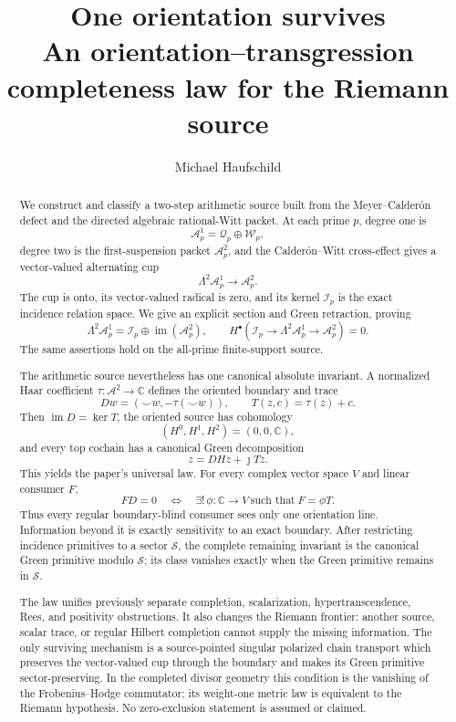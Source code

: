 \documentclass[11pt]{article}
\title{\textbf{One orientation survives}\\
\large An orientation--transgression completeness law for the Riemann source}
\author{Michael Haufschild}
\date{}
\theoremstyle{definition}
\theoremstyle{remark}
\newcommand{\C}{\mathbb C}
\newcommand{\cA}{\mathcal A}
\newcommand{\cI}{\mathcal I}
\newcommand{\cS}{\mathcal S}
\newcommand{\cQ}{\mathcal Q}
\newcommand{\cW}{\mathcal W}
\newcommand{\im}{\operatorname{im}}
\begin{document}
\maketitle

\begin{abstract}
We construct and classify a two-step arithmetic source built from the
Meyer--Calder\'on defect and the directed algebraic rational-Witt packet.
At each prime \(p\), degree one is
\[
  \cA_p^1=\cQ_p\oplus\cW_p,
\]
degree two is the first-suspension packet \(\cA_p^2\), and the
Calder\'on--Witt cross-effect gives a vector-valued alternating cup
\[
  \Lambda^2\cA_p^1\longrightarrow\cA_p^2.
\]
The cup is onto, its vector-valued radical is zero, and its kernel
\(\cI_p\) is the exact incidence relation space.  We give an explicit
section and Green retraction, proving
\[
  \Lambda^2\cA_p^1
    =\cI_p\oplus\im(\cA_p^2),\qquad
  H^\bullet\!\left(
    \cI_p\to\Lambda^2\cA_p^1\to\cA_p^2\right)=0.
\]
The same assertions hold on the all-prime finite-support source.

The arithmetic source nevertheless has one canonical absolute invariant.
A normalized Haar coefficient \(\tau:\cA^2\to\C\) defines the oriented
boundary and trace
\[
  D w=(\smile w,-\tau(\smile w)),\qquad
  T(z,c)=\tau(z)+c.
\]
Then \(\im D=\ker T\), the oriented source has cohomology
\[
                         (H^0,H^1,H^2)=(0,0,\C),
\]
and every top cochain has a canonical Green decomposition
\[
                         z=DHz+\jmath Tz.
\]
This yields the paper's universal law.  For every complex vector space
\(V\) and linear consumer \(F\),
\[
 F D=0
 \quad\Longleftrightarrow\quad
 \exists!\,\phi:\C\to V\ \text{such that}\ F=\phi T.
\]
Thus every regular boundary-blind consumer sees only one orientation
line.  Information beyond it is exactly sensitivity to an exact boundary.
After restricting incidence primitives to a sector \(\cS\), the complete
remaining invariant is the canonical Green primitive modulo \(\cS\);
its class vanishes exactly when the Green primitive remains in \(\cS\).

The law unifies previously separate completion, scalarization,
hypertranscendence, Rees, and positivity obstructions.  It also changes the
Riemann frontier: another source, scalar trace, or regular Hilbert
completion cannot supply the missing information.  The only surviving
mechanism is a source-pointed singular polarized chain transport which
preserves the vector-valued cup through the boundary and makes its Green
primitive sector-preserving.  In the completed divisor geometry this
condition is the vanishing of the Frobenius--Hodge commutator; its
weight-one metric law is equivalent to the Riemann hypothesis.  No
zero-exclusion statement is assumed or claimed.
\end{abstract}
\end{document}
